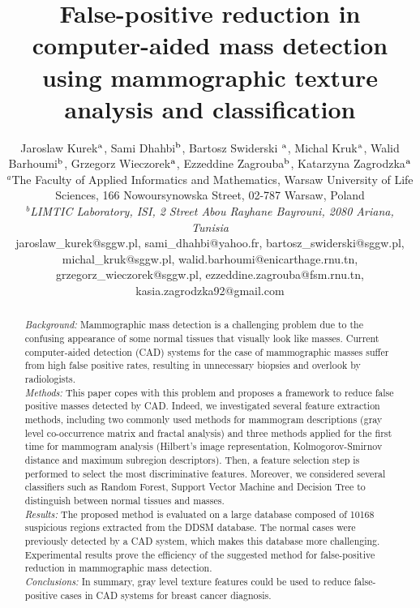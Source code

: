 \documentclass[review,12pt]{elsarticle}
\begin{document}
\thispagestyle{empty}

\begin{frontmatter}
\title{False-positive reduction in computer-aided mass detection using mammographic texture analysis and classification}

\author{Jaroslaw Kurek$^{\rm a}$, Sami Dhahbi$^{\rm b}$, Bartosz Swiderski $^{\rm a}$,  Michal Kruk$^{\rm a}$, Walid Barhoumi$^{\rm b}$, Grzegorz Wieczorek$^{\rm a}$, Ezzeddine Zagrouba$^{\rm b}$, Katarzyna Zagrodzka$^{\rm a}$ \\
 $^{a}$The Faculty of Applied Informatics and Mathematics, Warsaw University of Life Sciences, 166 Nowoursynowska Street, 02-787 Warsaw, Poland \\%
 $^{b}${\em{LIMTIC Laboratory, ISI, 2 Street Abou Rayhane Bayrouni, 2080 Ariana, Tunisia}}\\
jaroslaw{\_}kurek@sggw.pl, sami{\_}dhahbi@yahoo.fr, bartosz{\_}swiderski@sggw.pl,  michal{\_}kruk@sggw.pl, walid.barhoumi@enicarthage.rnu.tn, grzegorz{\_}wieczorek@sggw.pl, ezzeddine.zagrouba@fsm.rnu.tn, kasia.zagrodzka92@gmail.com
}
\begin{abstract}
\textit{Background: } Mammographic mass detection is a challenging problem due to the confusing appearance of some normal tissues that visually look like masses. Current computer-aided detection (CAD) systems for the case of mammographic masses suffer from high false positive rates, resulting in unnecessary biopsies and overlook by radiologists.\\
\textit{Methods:} This paper copes with this problem and proposes a framework to reduce false positive masses detected by CAD.  Indeed, we investigated several feature extraction methods, including two commonly used methods for mammogram descriptions (gray level co-occurrence matrix and fractal analysis) and three methods applied for the first time for mammogram analysis (Hilbert’s image representation, Kolmogorov-Smirnov distance and maximum subregion descriptors). Then, a feature selection step is performed to select the most discriminative features. Moreover, we considered several classifiers such as Random Forest, Support Vector Machine and Decision Tree to distinguish between normal tissues and masses.\\
\textit{Results:} The proposed method is evaluated on a large database composed of 10168 suspicious regions extracted from the DDSM database. The normal cases were previously detected by a CAD system, which makes this database more challenging. Experimental results prove the efficiency of the suggested method for false-positive reduction in mammographic mass detection.
\\
\textit{Conclusions:}  In summary, gray level texture features could be used to reduce false-positive cases in CAD systems for breast cancer diagnosis.


\end{abstract}
\end{frontmatter}
\end{document}
